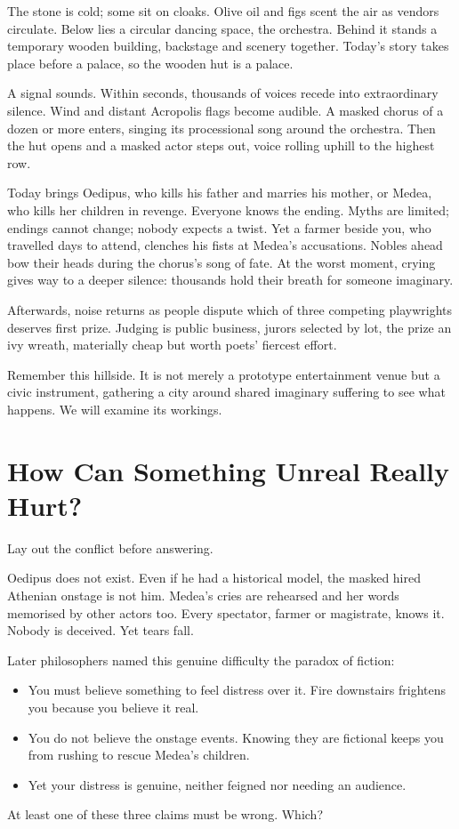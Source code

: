 The stone is cold; some sit on cloaks. Olive oil and figs scent the air as vendors circulate. Below lies a circular dancing space, the orchestra. Behind it stands a temporary wooden building, backstage and scenery together. Today's story takes place before a palace, so the wooden hut is a palace.

A signal sounds. Within seconds, thousands of voices recede into extraordinary silence. Wind and distant Acropolis flags become audible. A masked chorus of a dozen or more enters, singing its processional song around the orchestra. Then the hut opens and a masked actor steps out, voice rolling uphill to the highest row.

Today brings Oedipus, who kills his father and marries his mother, or Medea, who kills her children in revenge. Everyone knows the ending. Myths are limited; endings cannot change; nobody expects a twist. Yet a farmer beside you, who travelled days to attend, clenches his fists at Medea's accusations. Nobles ahead bow their heads during the chorus's song of fate. At the worst moment, crying gives way to a deeper silence: thousands hold their breath for someone imaginary.

Afterwards, noise returns as people dispute which of three competing playwrights deserves first prize. Judging is public business, jurors selected by lot, the prize an ivy wreath, materially cheap but worth poets' fiercest effort.

Remember this hillside. It is not merely a prototype entertainment venue but a civic instrument, gathering a city around shared imaginary suffering to see what happens. We will examine its workings.

\section{How Can Something Unreal Really Hurt?}
Lay out the conflict before answering.

Oedipus does not exist. Even if he had a historical model, the masked hired Athenian onstage is not him. Medea's cries are rehearsed and her words memorised by other actors too. Every spectator, farmer or magistrate, knows it. Nobody is deceived. Yet tears fall.

Later philosophers named this genuine difficulty the paradox of fiction:

\begin{itemize}
\item You must believe something to feel distress over it. Fire downstairs frightens you because you believe it real.
\item You do not believe the onstage events. Knowing they are fictional keeps you from rushing to rescue Medea's children.
\item Yet your distress is genuine, neither feigned nor needing an audience.
\end{itemize}
At least one of these three claims must be wrong. Which?

